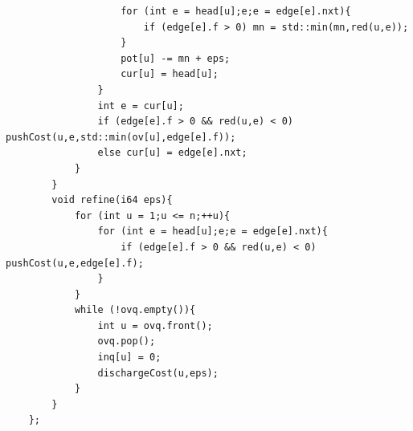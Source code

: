 \begin{lstlisting}
                    for (int e = head[u];e;e = edge[e].nxt){
                        if (edge[e].f > 0) mn = std::min(mn,red(u,e));
                    }
                    pot[u] -= mn + eps;
                    cur[u] = head[u];
                }
                int e = cur[u];
                if (edge[e].f > 0 && red(u,e) < 0) pushCost(u,e,std::min(ov[u],edge[e].f));
                else cur[u] = edge[e].nxt;
            }
        }
        void refine(i64 eps){
            for (int u = 1;u <= n;++u){
                for (int e = head[u];e;e = edge[e].nxt){
                    if (edge[e].f > 0 && red(u,e) < 0) pushCost(u,e,edge[e].f);
                }
            }
            while (!ovq.empty()){
                int u = ovq.front();
                ovq.pop();
                inq[u] = 0;
                dischargeCost(u,eps);
            }
        }
    };
\end{lstlisting}

